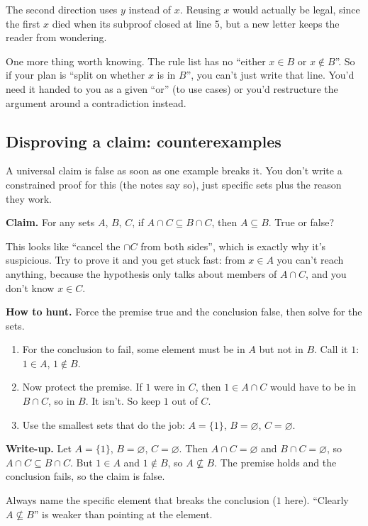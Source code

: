 The second direction uses $y$ instead of $x$. Reusing $x$ would actually be legal, since the first $x$ died when its subproof closed at line 5, but a new letter keeps the reader from wondering.

One more thing worth knowing. The rule list has no ``either $x\in B$ or $x\notin B$''. So if your plan is ``split on whether $x$ is in $B$'', you can't just write that line. You'd need it handed to you as a given ``or'' (to use cases) or you'd restructure the argument around a contradiction instead.

\subsection{Disproving a claim: counterexamples}

A universal claim is false as soon as one example breaks it. You don't write a constrained proof for this (the notes say so), just specific sets plus the reason they work.

\textbf{Claim.} For any sets $A$, $B$, $C$, if $A\cap C\subseteq B\cap C$, then $A\subseteq B$. True or false?

This looks like ``cancel the $\cap C$ from both sides'', which is exactly why it's suspicious. Try to prove it and you get stuck fast: from $x\in A$ you can't reach anything, because the hypothesis only talks about members of $A\cap C$, and you don't know $x\in C$.

\textbf{How to hunt.} Force the premise true and the conclusion false, then solve for the sets.
\begin{enumerate}
  \item For the conclusion to fail, some element must be in $A$ but not in $B$. Call it $1$: $1\in A$, $1\notin B$.
  \item Now protect the premise. If $1$ were in $C$, then $1\in A\cap C$ would have to be in $B\cap C$, so in $B$. It isn't. So keep $1$ out of $C$.
  \item Use the smallest sets that do the job: $A=\{1\}$, $B=\varnothing$, $C=\varnothing$.
\end{enumerate}

\textbf{Write-up.} Let $A=\{1\}$, $B=\varnothing$, $C=\varnothing$. Then $A\cap C=\varnothing$ and $B\cap C=\varnothing$, so $A\cap C\subseteq B\cap C$. But $1\in A$ and $1\notin B$, so $A\not\subseteq B$. The premise holds and the conclusion fails, so the claim is false.

Always name the specific element that breaks the conclusion ($1$ here). ``Clearly $A\not\subseteq B$'' is weaker than pointing at the element.

